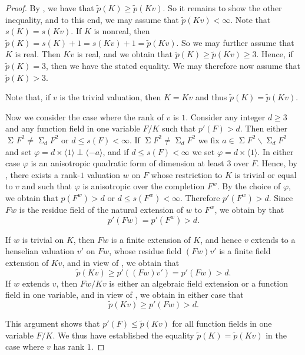 \documentclass[12pt,leqno]{amsart}
\newcommand{\la}{\langle}
\newcommand{\ra}{\rangle}
\renewcommand{\setminus}{\smallsetminus}
\DeclareMathOperator{\newsum}{\mathsf{\Sigma}}
\renewcommand{\sum}{\newsum}
\newcommand{\sums}[1]{\sum\!{#1}^2}
\newcommand{\sos}[2]{\sum_{#1}\!{#2}^2}
\newcommand{\wt}[1]{\widetilde{{#1}}}
\newcommand{\vf}{\varphi}
\renewcommand{\leq}{\leqslant}
\renewcommand{\geq}{\geqslant}
\numberwithin{equation}{section}
\theoremstyle{definition}
\theoremstyle{plain}
\begin{document}
\begin{proof}
By , we have that $\wt{p}(K)\geq\wt{p}(Kv)$.
So it remains to show the other inequality, and to this end, we may assume that $\wt{p}(Kv)<\infty$. 
Note that $s(K)=s(Kv)$.
If $K$ is nonreal, then $\wt{p}(K)=s(K)+1=s(Kv)+1=\wt{p}(Kv)$.
So we may further assume that $K$ is real. Then $Kv$ is real, 
and we obtain that $\wt{p}(K)\geq \wt{p}(Kv)\geq 3$.
Hence, if $\wt{p}(K)=3$, then we have the stated equality.
We may therefore now assume that $\wt{p}(K)>3$.

Note that, if $v$ is the trivial valuation, then $K=Kv$ and thus $\wt{p}(K)=\wt{p}(Kv)$.

Now we consider the case where the rank of $v$ is $1$.
Consider any integer $d\geq 3$ and any function field in one variable $F/K$ such that $p'(F)>d$.
Then either $\sos{}{F}\neq \sos{d}{F}$ or $d\leq s(F)<\infty$. 
If $\sums{F}\neq \sos{d}{F}$ we fix $a\in\sums{F}\setminus\sos{d}{F}$ and set $\vf=d\times\la 1\ra\perp\la -a\ra$, and if $d\leq s(F)<\infty$ we set $\vf=d\times \la 1\ra$.
In either case $\vf$ is an anisotropic quadratic form of dimension at least $3$ over $F$.
Hence, by 
, there exists a rank-$1$ valuation $w$ on $F$ whose restriction to $K$ is trivial or equal to $v$ and such that $\vf$ is anisotropic over the completion $F^w$.
By the choice of $\vf$, we obtain that 
$p(F^w)> d$ or $d\leq s(F^w)<\infty$.
Therefore $p'(F^w)> d$.
Since $Fw$ is the residue field of the natural extension of $w$ to $F^w$, we obtain by  that 
\[p'(Fw)=p'(F^w)> d.\]

If $w$ is trivial on $K$, then $Fw$ is a finite extension 
of $K$, and hence $v$ extends to a henselian valuation $v'$ on $Fw$, whose residue field $(Fw)v'$ is a finite field extension of $Kv$, and in view of , we obtain that 
\[ \wt{p}(Kv)\geq p'((Fw)v')=p'(Fw)>d.\]
If $w$ extends $v$, then $Fw/Kv$ is either an algebraic field extension or a function field in one variable, and in view of , we obtain in either case that \[\wt{p}(Kv)\geq p'(Fw)>d.\]

This argument shows that $p'(F)\leq \wt{p}(Kv)$ for all function fields in one variable $F/K$.
We thus have established the equality $\wt{p}(K)=\wt{p}(Kv)$ in the case where $v$ has rank $1$.


\end{proof}
\end{document}
